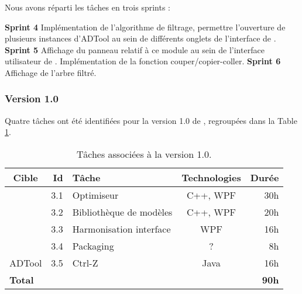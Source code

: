             Nous avons réparti les tâches en trois sprints :

            \noindent\textbf{Sprint 4} Implémentation de l'algorithme de filtrage, permettre l'ouverture de plusieurs instances d'ADTool au sein de différents onglets de l'interface de \glasir{}.\newline 
            \textbf{Sprint 5} Affichage du panneau relatif à ce module au sein de l'interface utilisateur de \glasir{}. Implémentation de la fonction couper/copier-coller.\newline %
            \textbf{Sprint 6} Affichage de l'arbre filtré.

        \subsubsection{Version 1.0}
            Quatre tâches ont été identifiées pour la version 1.0 de \glasir{}, regroupées dans la {\sc Table} \ref{tab:taches_units_3}.
            \begin{table}[h]
                \centering
                \begin{tabular}{|c|r|l|c|r|}
                    \hline
                    \textbf{Cible} & \textbf{Id} & \textbf{Tâche} & \textbf{Technologies} & \textbf{Durée}\\
                    \hline

                    \multirow{4}{*}{\glasir{}} & 3.1 & Optimiseur & C++, WPF & 30h\\
                    \cline{2-5}
                     & 3.2 & Bibliothèque de modèles & C++, WPF & 20h\\
                    \cline{2-5}
                     & 3.3 & Harmonisation interface & WPF & 16h\\
                    \cline{2-5}
                     & 3.4 & Packaging & ? & 8h\\
                    \hline

                    \multirow{1}{*}{ADTool} & 3.5 & Ctrl-Z & \multirow{1}{*}{Java} & 16h\\
                    \hline

                    \multicolumn{4}{|l|}{\bf Total} & {\bf 90h}\\
                    \hline
                \end{tabular}
                \caption{Tâches associées à la version 1.0.}
                \label{tab:taches_units_3}
            \end{table}
            
